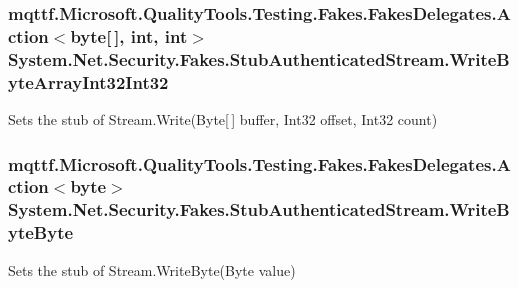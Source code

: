 \hypertarget{class_system_1_1_net_1_1_security_1_1_fakes_1_1_stub_authenticated_stream_a747c71a6d2b0271a10dc86571a255660}{
\subsubsection[{Write\-Byte\-Array\-Int32\-Int32}]{\setlength{\rightskip}{0pt plus 5cm}mqttf.\-Microsoft.\-Quality\-Tools.\-Testing.\-Fakes.\-Fakes\-Delegates.\-Action$<$byte\mbox{[}$\,$\mbox{]}, int, int$>$ System.\-Net.\-Security.\-Fakes.\-Stub\-Authenticated\-Stream.\-Write\-Byte\-Array\-Int32\-Int32}}\label{class_system_1_1_net_1_1_security_1_1_fakes_1_1_stub_authenticated_stream_a747c71a6d2b0271a10dc86571a255660}


Sets the stub of Stream.\-Write(\-Byte\mbox{[}$\,$\mbox{]} buffer, Int32 offset, Int32 count)

\hypertarget{class_system_1_1_net_1_1_security_1_1_fakes_1_1_stub_authenticated_stream_a6a1edd1a9fc604ef87a178dd1d8dd403}{
\subsubsection[{Write\-Byte\-Byte}]{\setlength{\rightskip}{0pt plus 5cm}mqttf.\-Microsoft.\-Quality\-Tools.\-Testing.\-Fakes.\-Fakes\-Delegates.\-Action$<$byte$>$ System.\-Net.\-Security.\-Fakes.\-Stub\-Authenticated\-Stream.\-Write\-Byte\-Byte}}\label{class_system_1_1_net_1_1_security_1_1_fakes_1_1_stub_authenticated_stream_a6a1edd1a9fc604ef87a178dd1d8dd403}


Sets the stub of Stream.\-Write\-Byte(\-Byte value)

